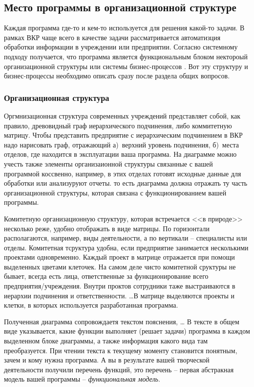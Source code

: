 \documentclass[a4paper,14pt,final]{extreport}
\begin{document}
\subsection{Место программы в организационной структуре}
\label{sec:designation}

Каждая программа где-то и кем-то используется для решения какой-то задачи.  В рамках ВКР чаще всего в качестве задачи рассматривается автоматизция обработки информации в учреждении или предприятии.  Согласно системному подходу \cite{sysap} получается, что программа является функциональным блоком нектороый организационной структуры или системы бизнес-процессов \cite{BP}.  Вот эту структуру и бизнес-процессы необходимо описать сразу после раздела общих вопросов.

\subsubsection{Организационная структура}
\label{sec:orgstruct}

Оргмнизационная структура современных учреждений представляет собой, как правило, древовидный граф иерархического подчинения, либо коммитетную матрицу.  Чтобы представить предприятие с иерархическим подчинением в ВКР надо нарисовать граф, отражающий а)~верхний уровень подчинения, б)~места отделов, где находится в эксплуатации ваша программа.  На диаграмме можно учесть также элементы организаионной структуры связанные с вашей программой коссвенно, например, в этих отделах готовят исходные данные для обработки или анализуруют отчеты.  то есть диаграмма должна отражать ту часть организационной структуры, которая связана с функционированием вашей программы.

Комитетную организационную структуру, которая встречается <<в природе>> несколько реже, удобно отображать в виде матрицы.  По горизонтали располагаются, например, виды деятельности, а по вертикали -- специалисты или отделы.  Комитетная тсруктура удобна, если предприятие занимается несколькими проектами одновременно.  Каждый проект в матрице отражается при помощи выделенных цветами клеточек.  На самом деле чисто комитетной сруктуры не бывает, всегда есть лица, ответственные за функционирование всего предприятия/учреждения.  Внутри проктов сотрудники таже выстраиваются в иерархии подчинения и ответственности.  \ldots{}В матрице выделяются проекты и клетки, в которых используется разработанная программа.

Полученная диаграмма сопровождаетя текстом пояснения, \ldots{}  В тексте в общем виде указывается, какие функции выполняет (решает задачи) программа в каждом выделенном блоке диаграммы, а также информация какого вида там преобразуется.  При чтении текста к текущему моменту становится понятным, зачем и кому нужна программа.  А вы в результате вашей творческой деятельности получили перечень функций, это перечень -- первая абстракная модель вашей программы -- \emph{функциональная модель}.
\end{document}
